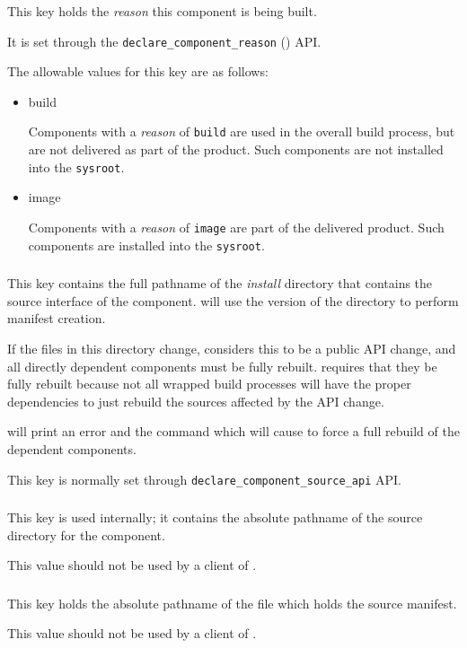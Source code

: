 This key holds the \emph{reason} this component is being built.

It is set through the \texttt{declare\_component\_reason}
() API.

The allowable values for this key are as follows:

\begin{itemize}
\item build

  Components with a \emph{reason} of \texttt{build} are used in the
  overall build process, but are not delivered as part of the product.
  Such components are not installed into the \texttt{sysroot}.

\item image

  Components with a \emph{reason} of \texttt{image} are part of the
  delivered product.  Such components are installed into the
  \texttt{sysroot}.

\end{itemize}
\subsubsection{}\label{lmsbwcomponent:souce-api}

This key contains the full pathname of the \emph{install} directory
that contains the source interface of the component.  \lmsbw will use
the \destdir version of the directory to perform \mtree manifest
creation.

If the files in this directory change, \lmsbw considers this to be a
public API change, and all directly dependent components must be fully
rebuilt.  \lmsbw requires that they be fully rebuilt because not all
wrapped build processes will have the proper dependencies to just
rebuild the sources affected by the API change.

\lmsbw will print an error and the command which will cause \lmsbw to
force a full rebuild of the dependent components.

This key is normally set through
\texttt{declare\_component\_source\_api} API.


\subsubsection{}
This key is used internally; it contains the absolute pathname of the
source directory for the component.

This value should not be used by a client of \lmsbw.

\subsubsection{}

This key holds the absolute pathname of the file which holds the
source \mtree manifest.

This value should not be used by a client of \lmsbw.



